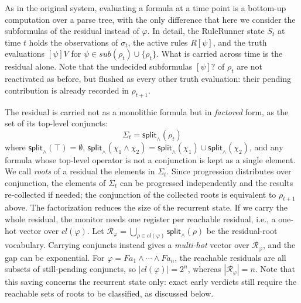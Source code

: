 

As in the original system, evaluating a formula at a time point is a bottom-up computation over a parse tree, with the only difference that here we consider the subformulas of the residual instead of $\varphi$. In detail, the RuleRunner state $S_t$ at time $t$ holds the observations of $\sigma_t$, the active rules $R[\psi]$, and the truth evaluations $[\psi]V$ for $\psi\in sub(\rho_t)\cup\{\rho_t\}$. What is carried across time is the residual alone. Note that the undecided subformulas $[\psi]?$ of $\rho_t$ are not reactivated as before, but flushed as every other truth evaluation: their pending contribution is already recorded in $\rho_{t+1}$.

The residual is carried not as a monolithic formula but in \emph{factored} form, as the set of its top-level conjuncts:
\[
    \Sigma_t = \mathsf{split}_\wedge(\rho_t)
\]
where $\mathsf{split}_\wedge(\top)=\emptyset$, $\mathsf{split}_\wedge(\chi_1\land\chi_2) = \mathsf{split}_\wedge(\chi_1)\cup\mathsf{split}_\wedge(\chi_2)$, and any formula whose top-level operator is not a conjunction is kept as a single element.
We call \emph{roots} of a residual the elements in $\Sigma_t$.
%
Since progression distributes over conjunction, the elements of $\Sigma_t$ can be progressed independently and the results re-collected if needed; the conjunction of the collected roots is equivalent to $\rho_{t+1}$ above. 
%
The factorization reduces the size of the recurrent state. If we carry the whole residual, the monitor needs one register per reachable residual, i.e., a one-hot vector over $cl(\varphi)$. Let $\mathcal R_\varphi=\bigcup_{\rho\in cl(\varphi)}\mathsf{split}_\wedge(\rho)$ be the residual-root vocabulary. Carrying conjuncts instead gives a \emph{multi-hot} vector over $\mathcal R_\varphi$, and the gap can be exponential. For $\varphi = F a_1 \land \cdots \land F a_n$, the reachable residuals are all subsets of still-pending conjuncts, so $|cl(\varphi)| = 2^n$, whereas $|\mathcal R_\varphi|=n$. Note that this saving concerns the recurrent state only: exact early verdicts still require the reachable sets of roots to be classified, as discussed below.

